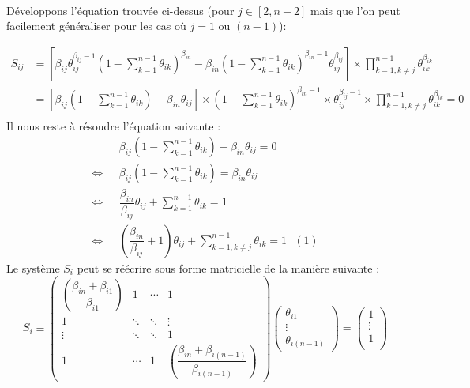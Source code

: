 \documentclass[a4paper,titlepage]{report}
\begin{document}
\paragraph{}
Développons l'équation trouvée ci-dessus (pour $j \in [2, n-2]$ mais que l'on peut facilement généraliser pour les cas où $j = 1$ ou $(n-1)$):

\[
	\begin{aligned}
		S_{ij} &= \left[\beta_{ij} \theta_{ij}^{\beta_{ij} - 1} \left(1 - \sum\limits_{k = 1}^{n - 1} \theta_{ik}\right)^{\beta_{in}} - \beta_{in} \left(1 - \sum\limits_{k = 1}^{n - 1} \theta_{ik}\right)^{\beta_{in} - 1} \theta_{ij}^{\beta_{ij}}\right] \times \prod\limits_{k = 1, k \neq j}^{n - 1} \theta_{ik}^{\beta_{ik}}\\
		&= \left[\beta_{ij}  \left(1 - \sum\limits_{k = 1}^{n - 1} \theta_{ik}\right) - \beta_{in}  \theta_{ij}\right]\times \left(1 - \sum\limits_{k = 1}^{n - 1} \theta_{ik}\right)^{\beta_{in} - 1} \times \theta_{ij}^{\beta_{ij} - 1} \times \prod\limits_{k = 1, k \neq j}^{n - 1} \theta_{ik}^{\beta_{ik}} = 0\\
	\end{aligned}
\]
Il nous reste à résoudre l'équation suivante :
\[
	\begin{aligned}
		&\beta_{ij} \left(1 - \sum\limits_{k = 1}^{n - 1} \theta_{ik}\right) - \beta_{in} \theta_{ij} = 0\\
		\Leftrightarrow \text{ }&\beta_{ij} \left(1 - \sum\limits_{k = 1}^{n - 1} \theta_{ik}\right) = \beta_{in} \theta_{ij}\\
		\Leftrightarrow \text{ }& \dfrac{\beta_{in}}{\beta_{ij}} \theta_{ij} + \sum\limits_{k = 1}^{n - 1} \theta_{ik} = 1\\
		\Leftrightarrow \text{ }& \left(\dfrac{\beta_{in}}{\beta_{ij}} + 1\right) \theta_{ij} + \sum\limits_{k = 1, k \neq j}^{n - 1} \theta_{ik} = 1 \text{ } (1)	
	\end{aligned}
\]
Le système $S_i$ peut se réécrire sous forme matricielle de la manière suivante : 
\[
S_i \equiv 
\begin{pmatrix}
\left(\dfrac{\beta_{in} + \beta_{i1}}{\beta_{i1}}\right) & 1 & \cdots & 1 \\
1 & \ddots &  \ddots & \vdots \\
\vdots &  \ddots & \ddots & 1\\
1 & \cdots & 1   & \left(\dfrac{\beta_{in} + \beta_{i(n - 1)}}{\beta_{i(n - 1)}}\right)
\end{pmatrix}
\begin{pmatrix}
\theta_{i1}\\
\vdots\\
\theta_{i(n - 1)}
\end{pmatrix}
= 
\begin{pmatrix}
1\\
\vdots\\
1\\
\end{pmatrix}
\]
\end{document}
